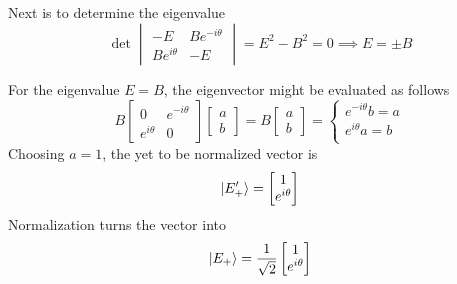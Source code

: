 \documentclass[../../../main.tex]{subfiles}
\begin{document}
Next is to determine the eigenvalue
\begin{equation*}
    \det \begin{vmatrix}
        -E           & Be^{-i\theta} \\
        Be^{i\theta} & -E
    \end{vmatrix}
    =
    E^2-B^2=0
    \implies
    E=\pm B
\end{equation*}

For the eigenvalue $E=B$, the eigenvector might be evaluated as follows
\begin{equation*}
    B \begin{bmatrix}
        0           & e^{-i\theta} \\
        e^{i\theta} & 0
    \end{bmatrix}
    \begin{bmatrix}
        a \\
        b
    \end{bmatrix}
    =  B
    \begin{bmatrix}
        a \\
        b
    \end{bmatrix}
    = \begin{cases}
        e^{-i\theta}b = a \\
        e^{i\theta}a = b  \\
    \end{cases}
\end{equation*}
Choosing $a=1$, the yet to be normalized vector is
\begin{equation*}
    \ket{E_+'} =
    \begin{bmatrix}
        1 \\e^{i\theta}
    \end{bmatrix}
\end{equation*}
Normalization turns the vector into
\begin{equation*}
    \ket{E_+} =
    \frac{1 }{\sqrt{2}}
    \begin{bmatrix}
        1 \\e^{i\theta}
    \end{bmatrix}
\end{equation*}
\end{document}
